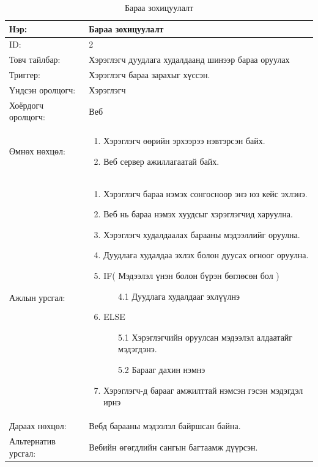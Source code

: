 \begin{center}
	\begin{table}[!htbp]
		\caption{Бараа зохицуулалт}
		\begin{tabular}{|p{4cm}|p{11cm}|}
			\hline
			Нэр: & Бараа зохицуулалт \\
			\hline
			ID: & 2 \\
			\hline
			Товч тайлбар: & Хэрэглэгч дуудлага худалдаанд шинээр бараа оруулах  \\
			\hline
			Триггер: & Хэрэглэгч бараа зарахыг хүссэн. \\
			\hline
			Үндсэн оролцогч: & Хэрэглэгч \\
			\hline
			Хоёрдогч оролцогч: & Веб  \\
			\hline
			Өмнөх нөхцөл: &  \begin{enumerate}
								\item Хэрэглэгч өөрийн эрхээрээ нэвтэрсэн байх.
								\item Веб сервер ажиллагаатай байх.
							\end{enumerate}
\\			\hline
			Ажлын урсгал: & \begin{enumerate}
								\item Хэрэглэгч бараа нэмэх сонгосноор энэ юз кейс эхлэнэ.
								\item Веб нь бараа нэмэх хуудсыг хэрэглэгчид харуулна.
								\item Хэрэглэгч худалдаалах барааны мэдээллийг оруулна.
                                \item Дуудлага худалдаа эхлэх болон дуусах огноог оруулна.
                                \item IF( Мэдээлэл үнэн болон бүрэн бөглөсөн бол )
									\begin{enumerate}
										\item[4.1] Дуудлага худалдааг эхлүүлнэ
									\end{enumerate}
								\item ELSE 
									\begin{enumerate}
										\item[5.1]  Хэрэглэгчийн оруулсан мэдээлэл алдаатайг мэдэгдэнэ.
										\item[5.2] Барааг дахин нэмнэ
									\end{enumerate}
							
							\item Хэрэглэгч-д барааг амжилттай нэмсэн гэсэн мэдэгдэл ирнэ
								\end{enumerate}
                                
\\						\hline
			Дараах нөхцөл: &  Вебд барааны мэдээлэл байршсан байна. \\
			\hline
			Альтернатив урсгал: &  Вебийн өгөгдлийн сангын багтаамж дүүрсэн. \\
			\hline
		\end{tabular}
	\end{table}
\end{center}

